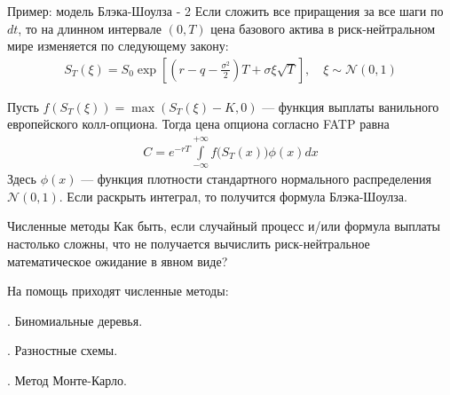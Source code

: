 \documentclass{beamer}
\begin{document}
\begin{frame}{Пример: модель Блэка-Шоулза - 2}
\justify
Если сложить все приращения за все шаги по $dt$, то на длинном интервале $(0, T)$ цена базового актива в риск-нейтральном мире изменяется по следующему закону:
\begin{align*}
S_T(\xi) = S_0\exp{\left[\left(r - q - \frac{\sigma^2}{2}\right)T + \sigma\xi\sqrt{T}\right]}, \quad \xi \sim \mathcal{N}(0, 1)
\end{align*}

\justify
Пусть $f(S_T(\xi)) = \max(S_T(\xi) - K, 0)$ --- функция выплаты ванильного европейского колл-опциона. Тогда цена опциона согласно FATP равна
\begin{align*}
C = e^{-rT} \int\limits_{-\infty}^{+\infty}f\Big(S_T(x)\Big)\phi(x)dx
\end{align*}
Здесь $\phi(x)$ --- функция плотности стандартного нормального распределения $\mathcal{N}(0,1)$. Если раскрыть интеграл, то получится формула Блэка-Шоулза.
\end{frame}



\begin{frame}{Численные методы}
\justify
Как быть, если случайный процесс и/или формула выплаты настолько сложны, что не получается вычислить риск-нейтральное математическое ожидание в явном виде?

\justify
На помощь приходят численные методы:

. Биномиальные деревья.

. Разностные схемы.

. Метод Монте-Карло.

\end{frame}
\end{document}
